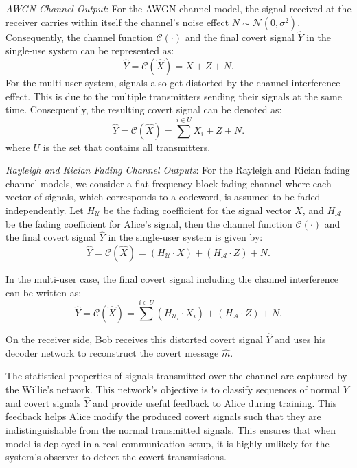 \textit{AWGN Channel Output}: For the AWGN channel model, the signal received at the receiver carries within itself the channel's noise effect \(N \sim \mathcal{N}(0, \sigma^2)\). Consequently, the channel function \(\mathcal{C}(\cdot)\) and the final covert signal \(\hat{Y}\) in the single-use system can be represented as:
\begin{equation}
	\hat{Y} = \mathcal{C}(\hat{X}) = X + Z + N.
\end{equation}
For the multi-user system, signals also get distorted by the channel interference effect. This is due to the multiple transmitters sending their signals at the same time. Consequently, the resulting covert signal can be denoted as:
\begin{equation}
	 \hat{Y} = \mathcal{C}(\hat{X}) = \sum^{i \in U}X_i + Z + N.
\end{equation}
where \(U\) is the set that contains all transmitters.

\textit{Rayleigh and Rician Fading Channel Outputs}: For the Rayleigh and Rician fading channel models, we consider a flat-frequency block-fading channel where each vector of signals, which corresponds to a codeword, is assumed to be faded independently. Let \(H_{\mathcal{U}}\) be the fading coefficient for the signal vector \(X\), and \(H_{\mathcal{A}}\) be the fading coefficient for Alice's signal, then the channel function \(\mathcal{C}(\cdot)\) and the final covert signal \(\hat{Y}\) in the single-user system is given by:
\begin{equation}
	\hat{Y} = \mathcal{C}(\hat{X}) = (H_{\mathcal{U}} \cdot X) + (H_{\mathcal{A}} \cdot Z) + N.
\end{equation}

In the multi-user case, the final covert signal including the channel interference can be written as:
\begin{equation}
	\hat{Y} = \mathcal{C}(\hat{X}) = \sum^{i \in U}(H_{\mathcal{U}_i} \cdot X_i) + (H_{\mathcal{A}} \cdot Z) + N.
\end{equation}

On the receiver side, Bob receives this distorted covert signal \(\hat{Y}\) and uses his decoder network to reconstruct the covert message \(\hat{m}\).

The statistical properties of signals transmitted over the channel are captured by the Willie's network. This network's objective is to classify sequences of normal \(Y\) and covert signals \(\hat{Y}\) and provide useful feedback to Alice during training. This feedback helps Alice modify the produced covert signals such that they are indistinguishable from the normal transmitted signals. This ensures that when model is deployed in a real communication setup, it is highly unlikely for the system's observer to detect the covert transmissions.

